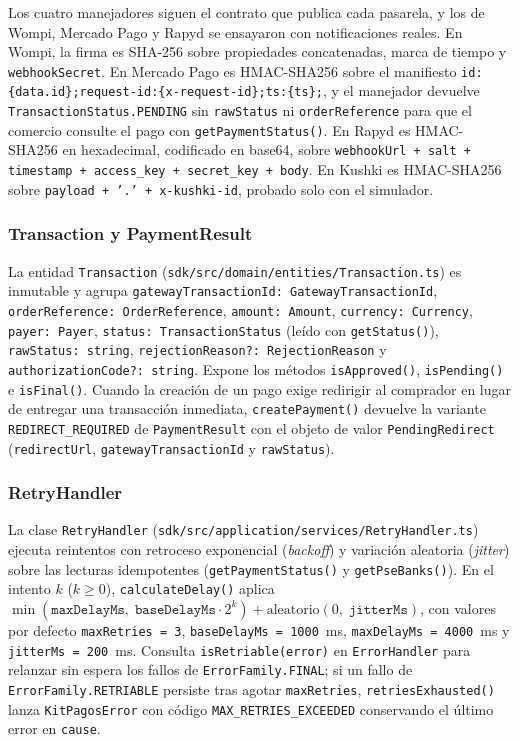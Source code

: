 Los cuatro manejadores siguen el contrato que publica cada pasarela, y los de Wompi, Mercado Pago y Rapyd se ensayaron con notificaciones reales. En Wompi, la firma es SHA-256 sobre propiedades concatenadas, marca de tiempo y \texttt{webhookSecret}. En Mercado Pago es HMAC-SHA256 sobre el manifiesto \texttt{id:\{data.id\};request-id:\{x-\allowbreak{}request-id\};ts:\{ts\};}, y el manejador devuelve \texttt{Transaction\allowbreak{}Status.PENDING} sin \texttt{rawStatus} ni \texttt{order\allowbreak{}Reference} para que el comercio consulte el pago con \texttt{getPaymentStatus()}. En Rapyd es HMAC-SHA256 en hexadecimal, codificado en base64, sobre \texttt{webhookUrl + salt + timestamp + access\_\allowbreak{}key + secret\_\allowbreak{}key + body}. En Kushki es HMAC-SHA256 sobre \texttt{payload + '.' + x-\allowbreak{}kushki-id}, probado solo con el simulador.

\subsubsection{Transaction y PaymentResult}
\begin{sloppypar}La entidad \texttt{Transaction} (\texttt{sdk/src/domain/entities/Transaction.ts}) es inmutable y agrupa \texttt{gatewayTransactionId: GatewayTransactionId}, \texttt{orderReference: OrderReference}, \texttt{amount: Amount}, \texttt{currency: Currency}, \texttt{payer: Payer}, \texttt{status: TransactionStatus} (leído con \texttt{getStatus()}), \texttt{rawStatus: string}, \texttt{rejectionReason?: RejectionReason} y \texttt{authorizationCode?: string}. Expone los métodos \texttt{isApproved()}, \texttt{isPending()} e \texttt{isFinal()}. Cuando la creación de un pago exige redirigir al comprador en lugar de entregar una transacción inmediata, \texttt{createPayment()} devuelve la variante \texttt{REDIRECT\_REQUIRED} de \texttt{PaymentResult} con el objeto de valor \texttt{PendingRedirect} (\texttt{redirectUrl}, \texttt{gatewayTransactionId} y \texttt{rawStatus}).\end{sloppypar}

\subsubsection{RetryHandler}
La clase \texttt{RetryHandler} (\texttt{sdk/src/application/services/RetryHandler.ts}) ejecuta reintentos con retroceso exponencial (\textit{backoff}) y variación aleatoria (\textit{jitter}) sobre las lecturas idempotentes (\texttt{getPaymentStatus()} y \texttt{getPseBanks()}). En el intento $k$ ($k \ge 0$), \texttt{calculateDelay()} aplica $\min(\texttt{maxDelayMs},\; \texttt{baseDelayMs} \cdot 2^k) + \mathrm{aleatorio}(0,\; \texttt{jitterMs})$, con valores por defecto \texttt{maxRetries = 3}, \texttt{baseDelayMs = 1000}~ms, \texttt{maxDelayMs = 4000}~ms y \texttt{jitterMs = 200}~ms. Consulta \texttt{isRetriable(error)} en \texttt{ErrorHandler} para relanzar sin espera los fallos de \texttt{ErrorFamily.FINAL}; si un fallo de \texttt{ErrorFamily.RETRIABLE} persiste tras agotar \texttt{maxRetries}, \texttt{retriesExhausted()} lanza \texttt{KitPagosError} con código \texttt{MAX\_RETRIES\_EXCEEDED} conservando el último error en \texttt{cause}.

